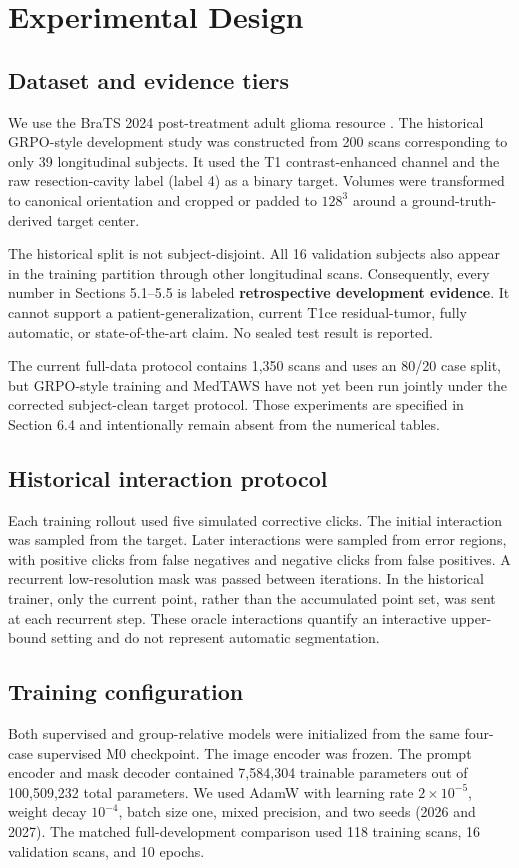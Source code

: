 \documentclass[10pt]{article}
\begin{document}
\section{Experimental Design}
\subsection{Dataset and evidence tiers}
We use the BraTS 2024 post-treatment adult glioma resource \cite{brats2024}. The historical GRPO-style development study was constructed from 200 scans corresponding to only 39 longitudinal subjects. It used the T1 contrast-enhanced channel and the raw resection-cavity label (label 4) as a binary target. Volumes were transformed to canonical orientation and cropped or padded to \(128^3\) around a ground-truth-derived target center.

The historical split is not subject-disjoint. All 16 validation subjects also appear in the training partition through other longitudinal scans. Consequently, every number in Sections 5.1--5.5 is labeled \textbf{retrospective development evidence}. It cannot support a patient-generalization, current T1ce residual-tumor, fully automatic, or state-of-the-art claim. No sealed test result is reported.

The current full-data protocol contains 1,350 scans and uses an 80/20 case split, but GRPO-style training and MedTAWS have not yet been run jointly under the corrected subject-clean target protocol. Those experiments are specified in Section 6.4 and intentionally remain absent from the numerical tables.

\subsection{Historical interaction protocol}
Each training rollout used five simulated corrective clicks. The initial interaction was sampled from the target. Later interactions were sampled from error regions, with positive clicks from false negatives and negative clicks from false positives. A recurrent low-resolution mask was passed between iterations. In the historical trainer, only the current point, rather than the accumulated point set, was sent at each recurrent step. These oracle interactions quantify an interactive upper-bound setting and do not represent automatic segmentation.

\subsection{Training configuration}
Both supervised and group-relative models were initialized from the same four-case supervised M0 checkpoint. The image encoder was frozen. The prompt encoder and mask decoder contained 7,584,304 trainable parameters out of 100,509,232 total parameters. We used AdamW with learning rate \(2\times10^{-5}\), weight decay \(10^{-4}\), batch size one, mixed precision, and two seeds (2026 and 2027). The matched full-development comparison used 118 training scans, 16 validation scans, and 10 epochs.
\end{document}
